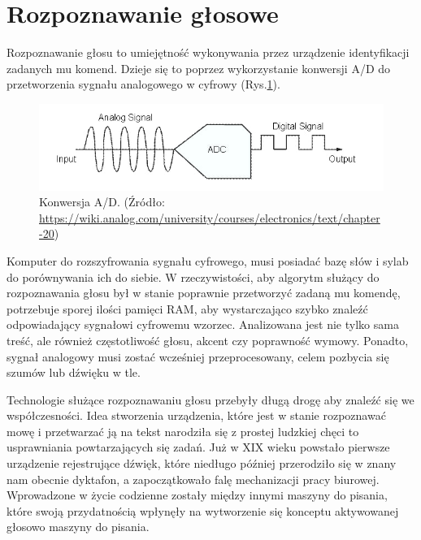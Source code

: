 
\section{Rozpoznawanie głosowe}
\label{sec:rozpoznawanieGlosowe}

Rozpoznawanie głosu to umiejętność wykonywania przez urządzenie identyfikacji zadanych mu komend. Dzieje się to poprzez wykorzystanie konwersji A/D do przetworzenia sygnału analogowego w cyfrowy (Rys.\ref{fig:ad}). 

\begin{figure}[h]
    \centering
    \includegraphics[width=0.95\linewidth]{files/ad.jpg}
    \caption{Konwersja A/D. (Źródło: \url{https://wiki.analog.com/university/courses/electronics/text/chapter-20})}
    \label{fig:ad}
\end{figure}

Komputer do rozszyfrowania sygnału cyfrowego, musi posiadać bazę słów i sylab do porównywania ich do siebie. W rzeczywistości, aby algorytm służący do rozpoznawania głosu był w stanie poprawnie przetworzyć zadaną mu komendę, potrzebuje sporej ilości pamięci RAM, aby wystarczająco szybko znaleźć odpowiadający sygnałowi cyfrowemu wzorzec. Analizowana jest nie tylko sama treść, ale również częstotliwość głosu, akcent czy poprawność wymowy. Ponadto, sygnał analogowy musi zostać wcześniej przeprocesowany, celem pozbycia się szumów lub dźwięku w tle.

Technologie służące rozpoznawaniu głosu przebyły długą drogę aby znaleźć się we współczesności. Idea stworzenia urządzenia, które jest w stanie rozpoznawać mowę i przetwarzać ją na tekst narodziła się z prostej ludzkiej chęci to usprawniania powtarzających się zadań. Już w XIX wieku powstało pierwsze urządzenie rejestrujące dźwięk, które niedługo później przerodziło się w znany nam obecnie dyktafon, a zapoczątkowało falę mechanizacji pracy biurowej. Wprowadzone w życie codzienne zostały między innymi maszyny do pisania, które swoją przydatnością wpłynęły na wytworzenie się konceptu aktywowanej głosowo maszyny do pisania. 


